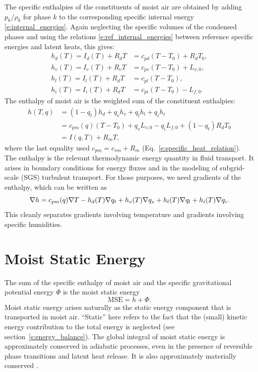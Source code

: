 \documentclass{report}
\begin{document}
The specific enthalpies of the constituents of moist air are obtained by adding $p_k/\rho_k$ for phase $k$ to the corresponding specific internal energy \eqref{e:internal_energies}. Again neglecting the specific volumes of the condensed phases and using the relations \eqref{e:ref_internal_energies} between reference specific energies and latent heats, this gives:
\begin{subequations}\label{e:enthalpies}
\begin{align}
    h_d(T) = I_d(T) + R_d T &= c_{pd}(T-T_0) + R_d T_0, \\
    h_v(T) = I_v(T) + R_v T &= c_{pv}(T-T_0) + L_{v,0}, \\
    h_l(T) = I_l(T) + R_d T &= c_{pl}(T-T_0), \\
    h_i(T) = I_i(T) + R_d T &= c_{pi}(T-T_0) - L_{f,0}.
\end{align}
\end{subequations}
The enthalpy of moist air is the weighted sum of the constituent enthalpies:
\begin{equation}
\begin{split}\label{e:enthalpy_definition}
    h(T, q)  &= (1-q_t) h_d + q_v h_v + q_l h_l + q_i h_i \\
        &= c_{pm}(q) (T-T_0) + q_v L_{v,0} - q_i L_{f,0} + (1-q_t) R_d T_0\\
        &= I(q, T) + R_m T,
\end{split}
\end{equation}
where the last equality used $c_{pm} = c_{vm} + R_m$ (Eq.~\ref{e:specific_heat_relation}). The enthalpy is the relevant thermodynamic energy quantity in fluid transport. It arises in boundary conditions for energy fluxes and in the modeling of subgrid-scale (SGS) turbulent transport. For those purposes, we need gradients of the enthalpy, which can be written as 
\begin{equation}\label{e:enthalpy_gradient}
    \nabla h = c_{pm}(q) \nabla T - h_d(T) \nabla q_t
    + h_v(T) \nabla q_v + h_l(T) \nabla q_l + h_i(T) \nabla q_i.
\end{equation}
This cleanly separates gradients involving temperature and gradients involving specific humidities.

\section{Moist Static Energy}

The sum of the specific enthalpy of moist air and the specific gravitational potential energy $\Phi$ is the moist static energy \citep{Neelin87a}
\begin{equation}\label{e:MSE}
\mathrm{MSE} = h + \Phi.
\end{equation}
Moist static energy arises naturally as the static energy component that is transported in moist air. ``Static'' here refers to the fact that the (small) kinetic energy contribution to the total energy is neglected (see section~\ref{s:energy_balance}). The global integral of moist static energy is approximately conserved in adiabatic processes, even in the presence of reversible phase transitions and latent heat release. It is also approximately materially conserved \citep{Romps15b}. 
\end{document}
